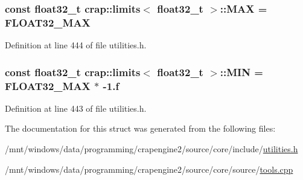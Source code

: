 \subsubsection[{M\+A\+X}]{\setlength{\rightskip}{0pt plus 5cm}const {\bf float32\+\_\+t} {\bf crap\+::limits}$<$ {\bf float32\+\_\+t} $>$\+::M\+A\+X = {\bf F\+L\+O\+A\+T32\+\_\+\+M\+A\+X}\hspace{0.3cm}{\ttfamily [static]}}\label{structcrap_1_1limits_3_01float32__t_01_4_a8487cda6ada7d746f8c0318dfd2fd046}


Definition at line 444 of file utilities.\+h.

\hypertarget{structcrap_1_1limits_3_01float32__t_01_4_a601378b6b1aa2281bda5e62d6737d4cf}{}
\subsubsection[{M\+I\+N}]{\setlength{\rightskip}{0pt plus 5cm}const {\bf float32\+\_\+t} {\bf crap\+::limits}$<$ {\bf float32\+\_\+t} $>$\+::M\+I\+N = {\bf F\+L\+O\+A\+T32\+\_\+\+M\+A\+X} $\ast$ -\/1.f\hspace{0.3cm}{\ttfamily [static]}}\label{structcrap_1_1limits_3_01float32__t_01_4_a601378b6b1aa2281bda5e62d6737d4cf}


Definition at line 443 of file utilities.\+h.



The documentation for this struct was generated from the following files\+:\begin{DoxyCompactItemize}
\item 
/mnt/windows/data/programming/crapengine2/source/core/include/\hyperlink{utilities_8h}{utilities.\+h}\item 
/mnt/windows/data/programming/crapengine2/source/core/source/\hyperlink{tools_8cpp}{tools.\+cpp}\end{DoxyCompactItemize}
